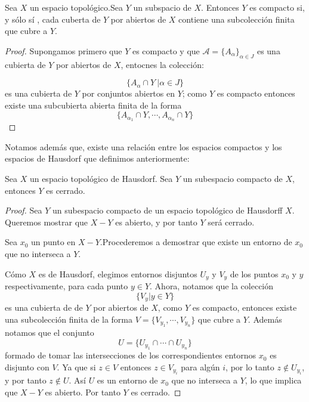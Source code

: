 \begin{lemma}
    Sea $X$ un espacio topológico.Sea $Y$ un subspacio de $X$. Entonces $Y$ es compacto si, y sólo sí , cada cuberta de $Y$ por abiertos de $X$ contiene una subcolección finita que cubre a $Y$.
\end{lemma}

\begin{proof}
Supongamos primero que $Y$ es compacto y que $\mathcal{A} = \{A_{\alpha}\}_{\alpha \in J}$ es una cubierta de $Y$ por abiertos de $X$, entocnes la colección:

\[
\{A_{\alpha} \cap Y\ | \alpha \in J\}
\]
es una cubierta de $Y$ por conjuntos abiertos en $Y$; como $Y$ es compacto entonces existe una subcubierta abierta finita de la forma 
\[
\{A_{\alpha_1} \cap Y, \cdots , A_{\alpha_n} \cap Y\}
\]

\end{proof}
Notamos además que, existe una relación entre los espacios compactos y los espacios de Hausdorf que definimos anteriormente: 
\begin{teorema}
    Sea $X$ un espacio topológico de Hausdorf. Sea $Y$ un subespacio compacto de $X$, entonces $Y$ es cerrado.
\end{teorema}

\begin{proof}
    Sea $Y$ un subespacio compacto de un espacio topológico de Hausdorff $X$. Queremos mostrar que  $X-Y$ es abierto, y por tanto $Y$ será cerrado.

    Sea $x_0$ un punto en $X-Y$.Procederemos a demostrar que existe un entorno de $x_0$ que no interseca a $Y$. 

    Cómo $X$ es de Hausdorf, elegimos entornos disjuntos $U_{y}$ y $V_y$ de los puntos $x_0$ y $y$ respectivamente, para cada punto $y \in Y$.
    Ahora, notamos que la colección
    \[
    \{V_y | y \in Y \}
    \] es una cubierta de de $Y$ por abiertos de $X$, como $Y$ es compacto, entonces existe una subcolección finita de la forma $V = \{V_{y_1},\cdots , V_{y_n}\}$ que cubre a $Y$.
    Además notamos que el conjunto 
    \[
    U = \{ U_{y_1} \cap \cdots \cap U_{y_n} \}
    \] formado de tomar las intersecciones de los correspondientes entornos $x_0$ es disjunto con $V$. Ya que si $z \in V$ entonces $z \in V_{y_i}$ para algún $i$, por lo tanto $z \notin U_{y_i}$, y por tanto $z \notin U$. Así $U$ es un entorno de $x_0$ que no interseca a $Y$, lo que implica que $X-Y$ es abierto. Por tanto $Y$ es cerrado.
\end{proof}

